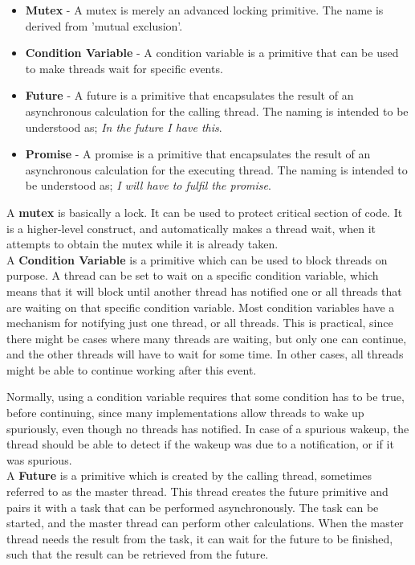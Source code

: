 \documentclass[a4paper]{article}
\begin{document}
\begin{itemize}
\item \textbf{Mutex} - A mutex is merely an advanced locking primitive. The name is derived from 'mutual exclusion'.
\item \textbf{Condition Variable} - A condition variable is a primitive that can be used to make threads wait for specific events.
\item \textbf{Future} - A future is a primitive that encapsulates the result of an asynchronous calculation for the calling thread. The naming is intended to be understood as; \textit{In the future I have this}.
\item \textbf{Promise} - A promise is a primitive that encapsulates the result of an asynchronous calculation for the executing thread. The naming is intended to be understood as; \textit{I will have to fulfil the promise}.
\end{itemize}


A \textbf{mutex} is basically a lock. It can be used to protect critical section of code. It is a higher-level construct, and automatically makes a thread wait, when it attempts to obtain the mutex while it is already taken.\\

A \textbf{Condition Variable} is a primitive which can be used to block threads on purpose. A thread can be set to wait on a specific condition variable, which means that it will block until another thread has notified one or all threads that are waiting on that specific condition variable. Most condition variables have a mechanism for notifying just one thread, or all threads. This is practical, since there might be cases where many threads are waiting, but only one can continue, and the other threads will have to wait for some time. In other cases, all threads might be able to continue working after this event. 

Normally, using a condition variable requires that some condition has to be true, before continuing, since many implementations allow threads to wake up spuriously, even though no threads has notified. In case of a spurious wakeup, the thread should be able to detect if the wakeup was due to a notification, or if it was spurious.\\

A \textbf{Future} is a primitive which is created by the calling thread, sometimes referred to as the master thread. This thread creates the future primitive and pairs it with a task that can be performed asynchronously. The task can be started, and the master thread can perform other calculations. When the master thread needs the result from the task, it can wait for the future to be finished, such that the result can be retrieved from the future.\\
\end{document}
